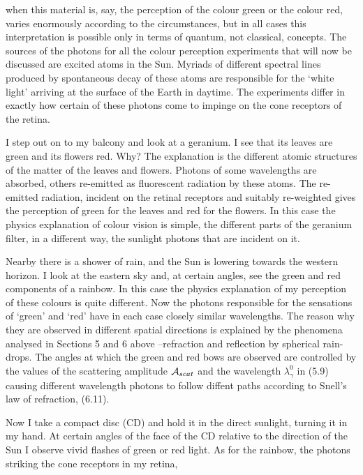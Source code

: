 {    when this material is, say, the perception of the colour green or the colour red, varies 
     enormously according to the circumstances, but in all cases  this interpretation is possible only in
    terms of quantum, not classical, concepts. The sources of the photons for all the colour perception
    experiments that will now be discussed are excited atoms in the Sun. Myriads of different spectral
  lines produced by spontaneous decay of these atoms are responsible for the `white light' arriving at the
   surface of the Earth in daytime. The experiments differ in exactly how certain of these photons come to impinge
    on the cone receptors of the retina.
    \par I step out on to my balcony and look at a geranium. I see that its leaves are green and its flowers
    red. Why? The explanation is the different atomic structures of the matter of the leaves and flowers.
    Photons of some wavelengths are absorbed, others re-emitted as fluorescent radiation by these atoms.
    The re-emitted radiation, incident on the retinal receptors and suitably re-weighted gives the perception
   of green for the leaves and red for the flowers. In this case the physics explanation of colour vision
    is simple, the different parts of the geranium filter, in a different way, the sunlight photons that are incident
    on it.
    \par Nearby there is a shower of rain, and the Sun is lowering towards the western horizon. I look at the
    eastern sky and, at certain angles, see the green and red components of a rainbow. In this case
    the physics explanation of my perception of these colours is quite different. Now the photons responsible
  for the sensations of `green' and `red' have in each case closely similar wavelengths. The reason
   why they are observed in different spatial directions is explained by the phenomena analysed in Sections 5 and 6
   above --refraction and reflection by spherical rain-drops. The angles at which the green and red bows are 
    observed are controlled by the values of the scattering amplitude ${\cal A}_{scat}$ and the 
    wavelength $\lambda_{\gamma}^0$ in (5.9) causing different wavelength photons to follow diffent paths
    according to Snell's law of refraction, (6.11).
    \par Now I take a compact disc (CD) and hold it in the direct sunlight, turning it in my hand. 
     At certain angles of the face of the CD relative to the direction of the Sun I observe vivid flashes of
    green or red light. As for the rainbow, the photons striking the cone receptors in my retina,
}
